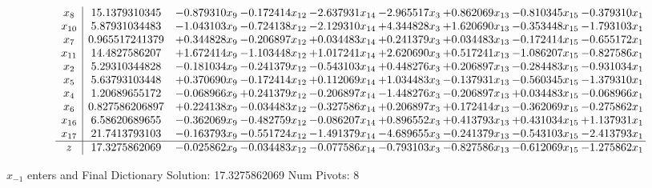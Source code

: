 \documentclass[10pt]{article}
\begin{document}
 \[\begin{array}{c| c c@{\hskip 2pt} c@{\hskip 2pt} c@{\hskip 2pt} c@{\hskip 2pt} c@{\hskip 2pt} c@{\hskip 2pt} c@{\hskip 2pt} }
 x_{8}   &  15.1379310345 & -0.879310 x_{9} & -0.172414 x_{12} & -2.637931 x_{14} & -2.965517 x_{3} & + 0.862069 x_{13} & -0.810345 x_{15} & -0.379310 x_{1}\\
 x_{10}   &  5.87931034483 & -1.043103 x_{9} & -0.724138 x_{12} & -2.129310 x_{14} & + 4.344828 x_{3} & + 1.620690 x_{13} & -0.353448 x_{15} & -1.793103 x_{1}\\
 x_{7}   &  0.965517241379 & + 0.344828 x_{9} & -0.206897 x_{12} & + 0.034483 x_{14} & + 0.241379 x_{3} & + 0.034483 x_{13} & -0.172414 x_{15} & -0.655172 x_{1}\\
 x_{11}   &  14.4827586207 & + 1.672414 x_{9} & -1.103448 x_{12} & + 1.017241 x_{14} & + 2.620690 x_{3} & + 0.517241 x_{13} & -1.086207 x_{15} & -0.827586 x_{1}\\
 x_{2}   &  5.29310344828 & -0.181034 x_{9} & -0.241379 x_{12} & -0.543103 x_{14} & + 0.448276 x_{3} & + 0.206897 x_{13} & -0.284483 x_{15} & -0.931034 x_{1}\\
 x_{5}   &  5.63793103448 & + 0.370690 x_{9} & -0.172414 x_{12} & + 0.112069 x_{14} & + 1.034483 x_{3} & -0.137931 x_{13} & -0.560345 x_{15} & -1.379310 x_{1}\\
 x_{4}   &  1.20689655172 & -0.068966 x_{9} & + 0.241379 x_{12} & -0.206897 x_{14} & -1.448276 x_{3} & -0.206897 x_{13} & + 0.034483 x_{15} & -0.068966 x_{1}\\
 x_{6}   &  0.827586206897 & + 0.224138 x_{9} & -0.034483 x_{12} & -0.327586 x_{14} & + 0.206897 x_{3} & + 0.172414 x_{13} & -0.362069 x_{15} & -0.275862 x_{1}\\
 x_{16}   &  6.58620689655 & -0.362069 x_{9} & -0.482759 x_{12} & -0.086207 x_{14} & + 0.896552 x_{3} & + 0.413793 x_{13} & + 0.431034 x_{15} & + 1.137931 x_{1}\\
 x_{17}   &  21.7413793103 & -0.163793 x_{9} & -0.551724 x_{12} & -1.491379 x_{14} & -4.689655 x_{3} & -0.241379 x_{13} & -0.543103 x_{15} & -2.413793 x_{1}\\
\hline
z    &  17.3275862069 & -0.025862 x_{9} & -0.034483 x_{12} & -0.077586 x_{14} & -0.793103 x_{3} & -0.827586 x_{13} & -0.612069 x_{15} & -1.275862 x_{1}\\
\end{array}\]


 $ x_{-1} $ enters and Final Dictionary
Solution:  17.3275862069
Num Pivots:  8
\end{document}
